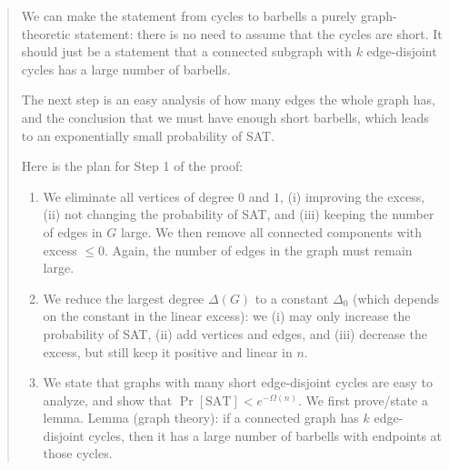 \documentclass[11pt,a4paper]{article}
\theoremstyle{definition}
\theoremstyle{remark}
\theoremstyle{plain}
\theoremstyle{definition}
\begin{document}
\begin{quote}\small
We can make the statement from cycles to barbells a purely graph-theoretic
statement: there is no need to assume that the cycles
are short. It should just be a statement that a connected subgraph with \(k\)
edge-disjoint cycles has a large number of barbells.

The next step is an easy analysis of how many edges the whole graph has, and
the conclusion that we must have enough short barbells, which leads to an
exponentially small probability of SAT.

Here is the plan for Step 1 of the proof:
\begin{enumerate}[label=\alph*)]
\item We eliminate all vertices of degree \(0\) and \(1\), (i) improving the
  excess, (ii) not changing the probability of SAT, and (iii) keeping the
  number of edges in \(G\) large. We then remove all connected components with
  excess \(\le0\). Again, the number of edges in the graph must remain large.
\item We reduce the largest degree \(\Delta(G)\) to a constant \(\Delta_0\)
  (which depends on the constant in the linear excess): we (i) may only
  increase the probability of SAT, (ii) add vertices and edges, and
  (iii) decrease the excess, but still keep it positive and linear in \(n\).
\item We state that graphs with many short edge-disjoint cycles are easy to
  analyze, and show that \(\Pr[\mathrm{SAT}]<e^{-\Omega(n)}\). We first
  prove/state a lemma. Lemma (graph theory): if a connected graph has \(k\)
  edge-disjoint cycles, then it has a large number of barbells with endpoints
  at those cycles.


\end{enumerate}
\end{quote}
\end{document}
